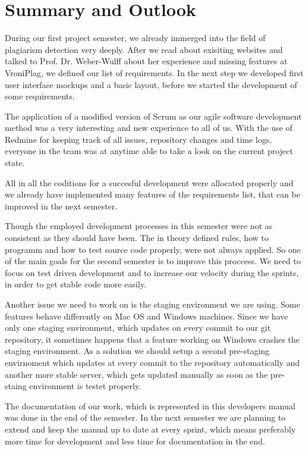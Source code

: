 \chapter{Summary and Outlook}\label{chap:summaryAndOutlook}

During our first project semester, we already immerged into the field of plagiarism detection very deeply. After
we read about exisiting websites and talked to Prof. Dr. Weber-Wulff about her experience and missing features
at VroniPlag, we defined our list of requirements. In the next step we developed first user interface mockups and
a basic layout, before we started the development of some requirements. 

The application of a modified version of Scrum as our agile software development method was a very interesting and new
experience to all of us. With the use of Redmine for keeping track of all issues, repository changes and time logs, everyone in the team was at anytime able to take a look on the current project state.

All in all the coditions for a succesful development were allocated properly and we already have implemented many features of the requirements list, that can be improved in the next semester.

Though the employed development processes in this semester were not as consistent as they should have been. The in theory defined rules, how to programm and how to test source code properly, were not always applied. So one of the main goals for the second semester is to improve this proccess. We need to focus on test driven development and to increase our velocity during the sprints, in order to get stable code more easily. 

Another issue we need to work on is the staging environment we are using. Some features behave differently on Mac OS and Windows machines. Since we have only one staging environment, which updates on every commit to our git repository, it sometimes happens that a feature working on Windows crashes the staging environment. As a solution we should setup a second pre-staging envirnoment which updates at every commit to the repository automatically and another more stable server, which gets updated manually as soon as the pre-staing environment is testet properly. 

The documentation of our work, which is represented in this developers manual was done in the end of the semester. In the next semester we are planning to extend and keep the manual up to date at every sprint, which means preferably more time for development and less time for documentation in the end.

